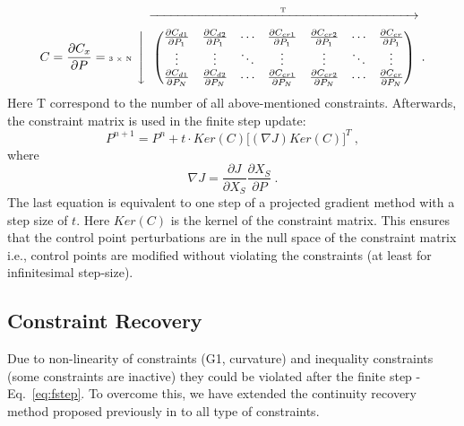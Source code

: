 \documentclass[9pt,academicons]{article}
\begin{document}
\begin{equation}
\label{eq:nurbsSens}
C =  
\frac{\partial C_x}{\partial P} =  
\text{\tiny{3 $\times$ N} }\myxmatrix{\begin{pmatrix}
  \frac{\partial C_{d1}}{\partial P_1} & \frac{\partial C_{d2}}{\partial P_1} &  \cdots & \frac{\partial C_{cr1}}{\partial P_1} & \frac{\partial C_{cr2}}{\partial P_1} & \cdots & \frac{\partial C_{cr}}{\partial P_1} \\
        \vdots  & \vdots  & \ddots & \vdots  & \vdots  & \ddots & \vdots  \\
          \frac{\partial C_{d1}}{\partial P_N} & \frac{\partial C_{d2}}{\partial P_N} &  \cdots & \frac{\partial C_{cr1}}{\partial P_N} & \frac{\partial C_{cr2}}{\partial P_N} & \cdots & \frac{\partial C_{cr}}{\partial P_N} \\
        \end{pmatrix}} \:.
\end{equation}
Here T correspond to the number of all above-mentioned constraints. Afterwards, the constraint matrix is used in the finite step update:
\begin{equation}
\label{eq:fstep}
P^{n+1} = P ^{n} +t \cdot Ker(C)\Big [(\nabla J) Ker(C)\Big]^T \:,
\end{equation}
where 
\begin{equation}
\nabla J =  \frac{\partial J}{\partial X_S} \frac{\partial X_S}{\partial P} \:.
\end{equation}
The last equation is equivalent to one step of a projected gradient method with a step size of $t$. Here $Ker(C)$ is the kernel of the constraint matrix. This ensures that the control point perturbations are in the null space of the constraint matrix i.e., control points are modified without violating the constraints (at least for infinitesimal step-size).

\subsection{Constraint Recovery}
Due to non-linearity of constraints (G1, curvature) and inequality constraints (some constraints are inactive) they could be violated after the finite step - Eq.~\eqref{eq:fstep}. To overcome this, we have extended the continuity recovery method proposed previously in \cite{xu13:cad-based} to all type of constraints. 
\end{document}
